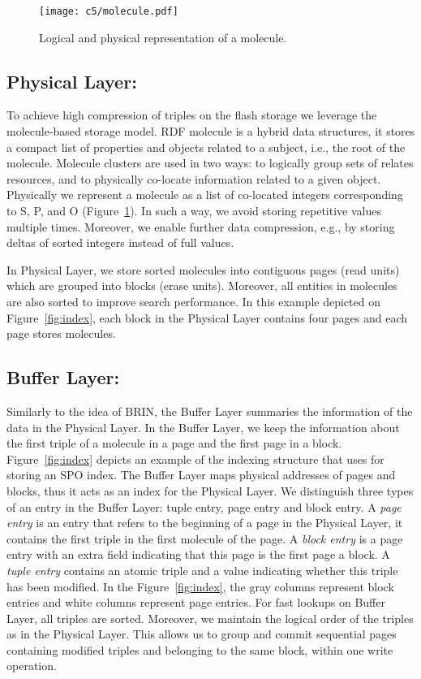 \begin{figure}[ht!]
	\centering
    \texttt{[image: c5/molecule.pdf]}
    \caption{Logical and physical representation of a molecule.}
    \label{fig:molecule}
\end{figure}

\subsection{Physical Layer:}  

To achieve high compression of triples on the flash storage we leverage the molecule-based storage model. 
RDF molecule is a hybrid data structures, it stores a compact list of properties and objects related to a subject, i.e., the root of the molecule.
Molecule clusters are used in two ways: to logically group sets of relates resources, and to physically co-locate information related to a given object. 
Physically we represent a molecule as a list of co-located integers corresponding to S, P, and O (Figure~\ref{fig:molecule}). 
In such a way, we avoid storing repetitive values multiple times. Moreover, we enable further data compression, e.g., by storing deltas of sorted integers instead of full values.


In Physical Layer, we store sorted molecules into contiguous pages (read units) which are grouped into blocks (erase units). Moreover, all entities in molecules are also sorted to improve search performance. In this example depicted on Figure~\ref{fig:index}, each block in the Physical Layer contains four pages and each page stores molecules. 

\subsection{Buffer Layer:}

Similarly to the idea of BRIN, the Buffer Layer summaries the information of the data in the Physical Layer.
In the Buffer Layer, we keep the information about the first triple of a molecule in a page and the first page in a block. Figure~\ref{fig:index} depicts an example of the indexing structure that uses for storing an SPO index. The Buffer Layer maps physical addresses of pages and blocks, thus it acts as an index for the Physical Layer. We distinguish three types of an entry in the Buffer Layer: tuple entry, page entry and block entry. A \emph{page entry} is an entry that refers to the beginning of a page in the Physical Layer, it contains the first triple in the first molecule of the page. A \emph{block entry} is a page entry with an extra field indicating that this page is the first page a block. A \emph{tuple entry} contains an atomic triple and a value indicating whether this triple has been modified. In the Figure~\ref{fig:index}, the gray columns represent block entries and white columns represent page entries. For fast lookups on Buffer Layer, all triples are sorted.  Moreover, we maintain the logical order of the triples as in the Physical Layer. This allows us to group and commit sequential pages containing modified triples and belonging to the same block, within one write operation.

